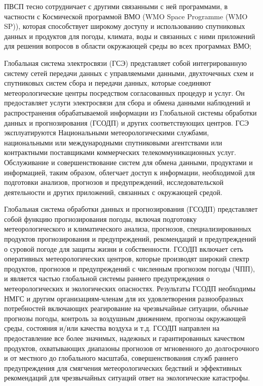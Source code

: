 ПВСП тесно сотрудничает с другими связанными с ней программами, в частности с Космической программой ВМО (WMO Space Programme (WMO SP)), которая способствует широкому доступу и использованию спутниковых данных и продуктов для погоды, климата, воды и связанных с ними приложений для решения вопросов в области окружающей среды во всех программах ВМО; 

Глобальная система электросвязи (ГСЭ) представляет собой интегрированную систему сетей передачи данных с управляемыми данными, двухточечных схем и спутниковых систем сбора и передачи данных, которые соединяют метеорологические центры посредством согласованных процедур и услуг. Он предоставляет услуги электросвязи для сбора и обмена данными наблюдений и распространения обрабатываемой информации из Глобальной системы обработки данных и прогнозирования (ГСОДП) и других соответствующих центров. ГСЭ эксплуатируются Национальными метеорологическими службами, национальными или международными спутниковыми агентствами или контрактными поставщиками коммерческих телекоммуникационных услуг. Обслуживание и совершенствование систем для обмена данными, продуктами и информацией, таким образом, облегчает доступ к информации, необходимой для подготовки анализов, прогнозов и предупреждений, исследовательской деятельности и других приложений, связанных с окружающей средой.

Глобальная система обработки данных и прогнозирования (ГСОДП) представляет собой функцию прогнозирования погоды, включая подготовку метеорологического и климатического анализа, прогнозов, специализированных продуктов прогнозирования и предупреждений, рекомендаций и предупреждений о суровой погоде для защиты жизни и собственности. ГСОДП включает сеть оперативных метеорологических центров, которые производят широкий спектр продуктов, прогнозов и предупреждений с численным прогнозом погоды (ЧПП), и является частью глобальной системы раннего предупреждения о метеорологических и экологических опасностях. Результаты ГСОДП необходимы НМГС и другим организациям-членам для их удовлетворения разнообразных потребностей включающих реагирование на чрезвычайные ситуации, обычные прогнозы погоды, контроль за воздушным движением, прогнозы окружающей среды, состояния и/или качества воздуха и т.д. ГСОДП направлен на предоставление все более значимых, надежных и гарантированных качеством продуктов, охватывающих диапазоны прогнозов от мгновенного до долгосрочного и от местного до глобального масштаба, совершенствования служб раннего предупреждения для смягчения метеорологических бедствий и эффективных рекомендаций для чрезвычайных ситуаций ответ на экологические катастрофы.


